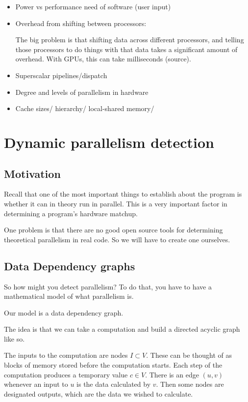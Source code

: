 \documentclass[12pt,twoside]{reedthesis}
\begin{document}
	\begin{itemize}
		\item Power vs performance need of software (user input)
		
		\item Overhead from shifting between processors:
		
		The big problem is that shifting data across different processors, and telling those processors to do things with that data takes a significant amount of overhead. With GPUs, this can take milliseconds (source). 
		
		\item Superscalar pipelines/dispatch
		
		\item Degree and levels of parallelism in hardware
		
		\item Cache sizes/ hierarchy/ local-shared memory/ 
		
	\end{itemize}

\chapter{Dynamic parallelism detection}
	\section{Motivation}
		Recall that one of the most important things to establish about the program is whether it can in theory run in parallel. This is a very important factor in determining a program's hardware matchup. 
		
		One problem is that there are no good open source tools for determining theoretical parallelism in real code. So we will have to create one ourselves. 
	
	\section{Data Dependency graphs}
		So how might you detect parallelism? To do that, you have to have a mathematical model of what parallelism is. 
		
		Our model is a data dependency graph. 
		
		The idea is that we can take a computation and build a directed acyclic graph like so.  
		
		The inputs to the computation are nodes $I \subset V$. These can be thought of as blocks of memory stored before the computation starts. Each step of the computation produces a temporary value $c \in V$. There is an edge $(u,v)$ whenever an input to $u$ is the data calculated by $v$. Then some nodes are designated outputs, which are the data we wished to calculate. 
		
\end{document}
